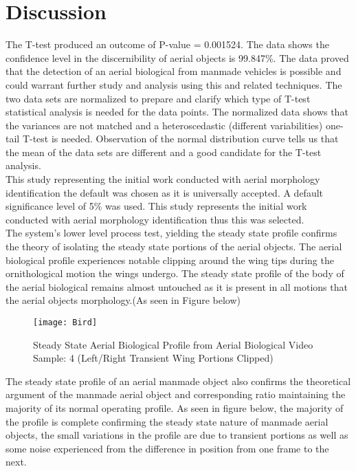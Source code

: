 \section{Discussion}
\indent The T-test produced an outcome of P-value = 0.001524. The data shows the confidence level in the discernibility of aerial objects is 99.847\%. The data proved that the detection of an aerial biological from manmade vehicles is possible and could warrant further study and analysis using this and related techniques.
\indent The two data sets are normalized to prepare and clarify which type of T-test statistical analysis is needed for the data points. The normalized data shows that the variances are not matched and a heteroscedastic (different variabilities) one-tail T-test is needed. Observation of the normal distribution curve tells us that the mean of the data sets are different and a good candidate for the T-test analysis.\\  
\indent This study representing the initial work conducted with aerial morphology identification the default was chosen as it is universally accepted. A default significance level of 5\% was used. This study represents the initial work conducted with aerial morphology identification thus this was selected.\\
\indent The system's lower level process test, yielding the steady state profile confirms the theory of isolating the steady state portions of the aerial objects. The aerial biological profile experiences notable clipping around the wing tips during the ornithological motion the wings undergo. The steady state profile of the body of the aerial biological remains almost untouched as it is present in all motions that the aerial objects morphology.(As seen in Figure below)\\   
\begin{figure}[ht]
	\center 
	\texttt{[image: Bird]}
	\caption[Steady State Aerial Biological Profile]{Steady State Aerial Biological Profile from  Aerial Biological Video Sample: 4 (Left/Right Transient Wing Portions Clipped)}
\end{figure}
The steady state profile of an aerial manmade object also confirms the theoretical argument of the manmade aerial object and corresponding ratio maintaining the majority of its normal operating profile. As seen in figure below, the majority of the profile is complete confirming the steady state nature of manmade aerial objects, the small variations in the profile are due to transient portions as well as some noise experienced from the difference in position from one frame to the next.\\  
